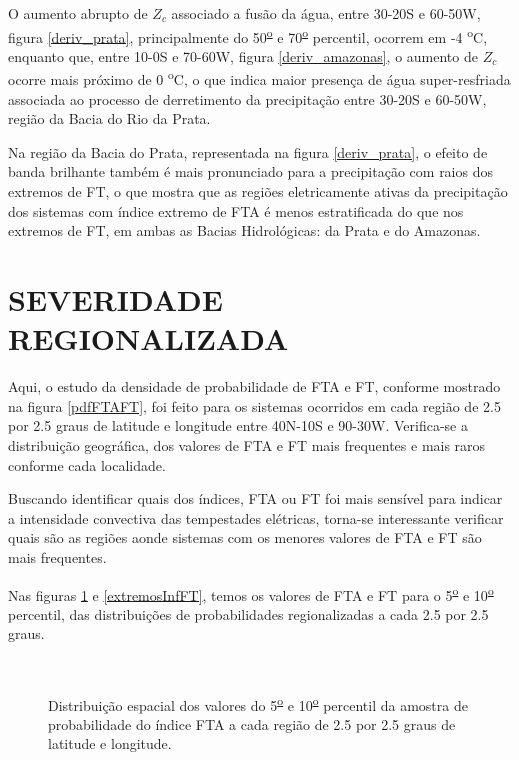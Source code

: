 O aumento abrupto de $Z_c$ associado a fusão da água, entre 30-20S e 60-50W, figura \ref{deriv_prata}, principalmente do 50\textsuperscript{\underline{o}} e 70\textsuperscript{\underline{o}} percentil, ocorrem em -4 \textsuperscript{o}C, enquanto que, entre 10-0S e 70-60W, figura \ref{deriv_amazonas}, o aumento de $Z_c$ ocorre mais próximo de 0 \textsuperscript{o}C, o que indica maior presença de água super-resfriada associada ao processo de derretimento da precipitação entre 30-20S e 60-50W, região da Bacia do Rio da Prata.  

Na região da Bacia do Prata, representada na figura \ref{deriv_prata}, o efeito de banda brilhante também é mais pronunciado para a precipitação com raios dos extremos de FT, o que mostra que as regiões eletricamente ativas da precipitação dos sistemas com índice extremo de FTA é menos estratificada do que nos extremos de FT, em ambas as Bacias Hidrológicas: da Prata e do Amazonas.

\newpage
\section{SEVERIDADE REGIONALIZADA}

Aqui, o estudo da densidade de probabilidade de FTA e FT, conforme mostrado na figura \ref{pdfFTAFT}, foi feito para os sistemas ocorridos em cada região de 2.5 por 2.5 graus de latitude e longitude entre 40N-10S e 90-30W. Verifica-se a distribuição geográfica, dos valores de FTA e FT mais frequentes e mais raros conforme cada localidade.

Buscando identificar quais dos índices, FTA ou FT foi mais sensível para indicar a intensidade convectiva das tempestades elétricas, torna-se interessante verificar quais são as regiões aonde sistemas com os menores valores de FTA e FT são mais frequentes.

Nas figuras \ref{extremosInfFTA} e \ref{extremosInfFT}, temos os valores de FTA e FT  para o 5\textsuperscript{\underline{o}} e 10\textsuperscript{\underline{o}} percentil, das distribuições de probabilidades regionalizadas a cada 2.5 por 2.5 graus.

\begin{figure}
  \\
  \caption{Distribuição espacial dos valores do 5\textsuperscript{\underline{o}} e 10\textsuperscript{\underline{o}} percentil da amostra de probabilidade do índice FTA a cada região de 2.5 por 2.5 graus de latitude e longitude.}
\label{extremosInfFTA}
\end{figure} 

